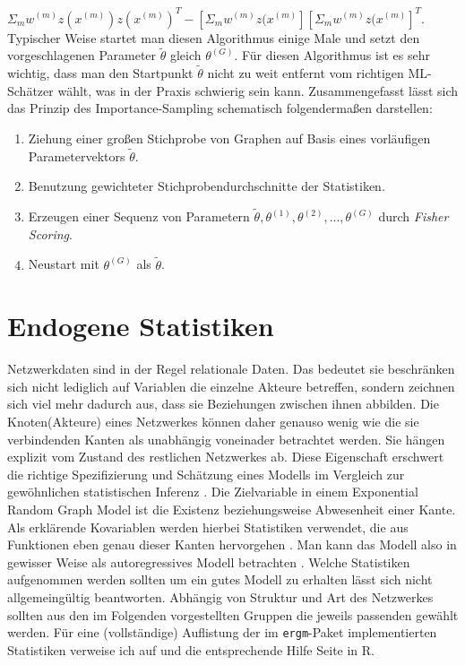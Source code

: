 \documentclass[a4paper,ngerman,oneside,titlepage,bibliography=totoc,11pt]{scrreprt}
\begin{document}
$\Sigma_m w^{(m)} z(x^{(m)}) z(x^{(m)})^T - \left[\Sigma_m w^{(m)} z(x^{(m)}\right] \left[\Sigma_m w^{(m)} z(x^{(m)}\right]^T$.
Typischer Weise startet man diesen Algorithmus einige Male und setzt den vorgeschlagenen Parameter $\widetilde{\theta}$ gleich $\theta^{(G)}$. Für diesen Algorithmus ist es sehr wichtig, dass man den Startpunkt $\widetilde{\theta}$ nicht zu weit entfernt vom richtigen ML-Schätzer wählt, was in der Praxis schwierig sein kann. Zusammengefasst lässt sich das Prinzip des Importance-Sampling schematisch folgendermaßen darstellen:

	\begin{enumerate}
		\item Ziehung einer großen Stichprobe von Graphen auf Basis eines vorläufigen Parametervektors $\tilde{\theta}$.
		\item Benutzung gewichteter Stichprobendurchschnitte der Statistiken.
		\item Erzeugen einer Sequenz von Parametern $\widetilde{\theta},\theta^{(1)}, \theta^{(2)},...,\theta^{(G)}$ durch \emph{Fisher Scoring}.
		\item Neustart mit $\theta^{(G)}$ als $\tilde{\theta}$.
	\end{enumerate}


\section{Endogene Statistiken}
Netzwerkdaten sind in der Regel relationale Daten. Das bedeutet sie beschränken sich nicht lediglich auf Variablen die einzelne Akteure betreffen, sondern zeichnen sich viel mehr dadurch aus, dass sie Beziehungen zwischen ihnen abbilden. Die Knoten(Akteure) eines Netzwerkes können daher genauso wenig wie die sie verbindenden Kanten als unabhängig voneinader betrachtet werden. Sie hängen explizit vom Zustand des restlichen Netzwerkes ab. Diese Eigenschaft erschwert die richtige Spezifizierung und Schätzung eines Modells im Vergleich zur gewöhnlichen statistischen Inferenz \citep{handcock2008statnet}. 
Die Zielvariable in einem Exponential Random Graph Model ist die Existenz beziehungsweise Abwesenheit einer Kante. Als erklärende Kovariablen werden hierbei Statistiken verwendet, die aus Funktionen eben genau dieser Kanten hervorgehen . Man kann das Modell also in gewisser Weise als autoregressives Modell betrachten \citep{morris2008specification}. Welche Statistiken aufgenommen werden sollten um ein gutes Modell zu erhalten lässt sich nicht allgemeingültig beantworten. Abhängig von Struktur und Art des Netzwerkes sollten aus den im Folgenden vorgestellten Gruppen die jeweils passenden gewählt werden. Für eine (vollständige) Auflistung der im \texttt{ergm}-Paket \citep{pack:ergm} implementierten Statistiken verweise ich auf \citep{morris2008specification} und die entsprechende Hilfe Seite in R.
\end{document}

